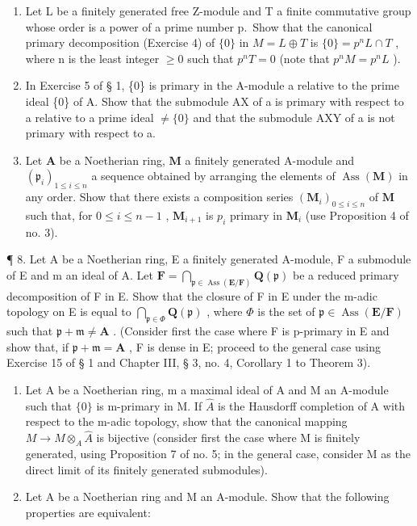 \begin{enumerate}
\end{enumerate}

\begin{enumerate}
\def\labelenumi{\arabic{enumi}.}
\setcounter{enumi}{4}
\item
  Let L be a finitely generated free Z-module and T a finite commutative group whose order is a power of a prime number p.~Show that the canonical primary decomposition (Exercise 4) of \(\{0\}\) in \(M = L \oplus T\) is \(\{0\} = p^{n}L \cap T\) , where n is the least integer \(\geqslant 0\) such that \(p^{n}T = 0\) (note that \(p^{n}M = p^{n}L\) ).
\item
  In Exercise 5 of § 1, \{0\} is primary in the A-module a relative to the prime ideal \{0\} of A. Show that the submodule AX of a is primary with respect to a relative to a prime ideal \(\neq\{0\}\) and that the submodule AXY of a is not primary with respect to a.
\item
  Let \(\mathbf{A}\) be a Noetherian ring, \(\mathbf{M}\) a finitely generated A-module and \((\mathfrak{p}_i)_{1\leqslant i\leqslant n}\) a sequence obtained by arranging the elements of \(\operatorname {Ass}(\mathbf{M})\) in any order. Show that there exists a composition series \((\mathbf{M}_i)_{0\leqslant i\leqslant n}\) of \(\mathbf{M}\) such that, for \(0\leqslant i\leqslant n - 1\) , \(\mathbf{M}_{i + 1}\) is \(p_i\) primary in \(\mathbf{M}_i\) (use Proposition 4 of no. 3).
\end{enumerate}

¶ 8. Let A be a Noetherian ring, E a finitely generated A-module, F a submodule of E and m an ideal of A. Let \(\mathbf{F} = \bigcap_{\mathfrak{p} \in \operatorname{Ass}(\mathbf{E}/\mathbf{F})} \mathbf{Q}(\mathfrak{p})\) be a reduced primary decomposition of F in E. Show that the closure of F in E under the m-adic topology on E is equal to \(\bigcap_{\mathfrak{p} \in \Phi} \mathbf{Q}(\mathfrak{p})\) , where \(\Phi\) is the set of \(\mathfrak{p} \in \operatorname{Ass}(\mathbf{E}/\mathbf{F})\) such that \(\mathfrak{p} + \mathfrak{m} \neq \mathbf{A}\) . (Consider first the case where F is p-primary in E and show that, if \(\mathfrak{p} + \mathfrak{m} = \mathbf{A}\) , F is dense in E; proceed to the general case using Exercise 15 of § 1 and Chapter III, § 3, no. 4, Corollary 1 to Theorem 3).

\begin{enumerate}
\def\labelenumi{\arabic{enumi}.}
\setcounter{enumi}{8}
\item
  Let A be a Noetherian ring, m a maximal ideal of A and M an A-module such that \(\{0\}\) is m-primary in M. If \(\hat{A}\) is the Hausdorff completion of A with respect to the m-adic topology, show that the canonical mapping \(M \to M \otimes_{A} \hat{A}\) is bijective (consider first the case where M is finitely generated, using Proposition 7 of no. 5; in the general case, consider M as the direct limit of its finitely generated submodules).
\item
  Let A be a Noetherian ring and M an A-module. Show that the following properties are equivalent:
\end{enumerate}

